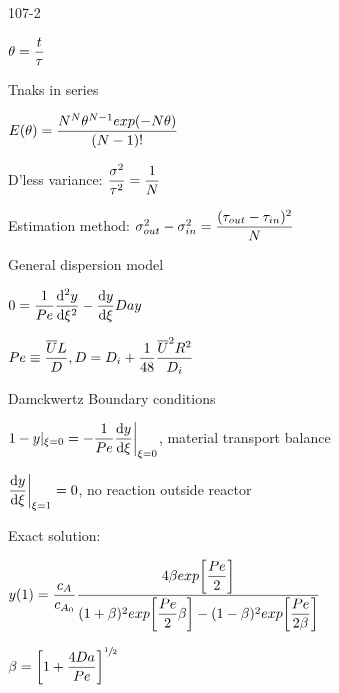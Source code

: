 \begin{mitframe}{107-2}
 \begin{listone}
	\item $\theta=\dfrac{\timet}{\torque}$
    \item Tnaks in series
    	\begin{listtwo}
        	\item $\energy(\theta)=\dfrac{\nummoles^{\nummoles}\theta^{\nummoles-1}exp(-\nummoles\theta)}{(\nummoles-1)!}$
            \item D'less variance: $\dfrac{\molecrad^2}{\torque^2}=\dfrac{1}{\nummoles}$
            \item Estimation method: $\molecrad_{out}^2-\molecrad_{in}^2=\dfrac{(\torque_{out}-\torque_{in})^2}{\nummoles}$
			\end{listtwo}
    \item General dispersion model
    \item $0=\dfrac{1}{\peclet}\dfrac{\mathrm{d}^2y}{\mathrm{d}\extent^2}-\dfrac{\mathrm{d}y}{\mathrm{d}\extent}\damkohler{y}$
		\begin{listtwo}
        	\item $\peclet\equiv\dfrac{\overline{\uvel}\length}{\elecdisplace}, \elecdisplace=\pdiff+\dfrac{1}{48}\dfrac{\overline{\uvel}^2\gasconst^2}{\pdiff}$
            \item Damckwertz Boundary conditions
            	\begin{listthree}
                	\item $1-y|_{\extent=\init}=-\dfrac{1}{\peclet}\dfrac{\mathrm{d}y}{\mathrm{d}\extent}\bigg|_{\extent=\init}$, material transport balance
                    \item $\dfrac{\mathrm{d}y}{\mathrm{d}\extent}\bigg|_{\extent=1}=0$, no reaction outside reactor
                \end{listthree}
        \end{listtwo}
\item Exact solution:
\item $y(1)=\dfrac{c_{\helmholtz}}{c_{\helmholtz_{\init}}}\dfrac{4\texpcoeff{exp}\bigg[\dfrac{\peclet}{2}\bigg]}{(1+\texpcoeff)^2{exp}\bigg[\dfrac{\peclet}{2}\texpcoeff\bigg]-(1-\texpcoeff)^2{exp}\bigg[\dfrac{\peclet}{2\texpcoeff}\bigg]}$
\item $\texpcoeff=\bigg[1+\dfrac{4\damkohler}{\peclet}\bigg]^{\sfrac{1}{2}}$
\end{listone}
\end{mitframe}